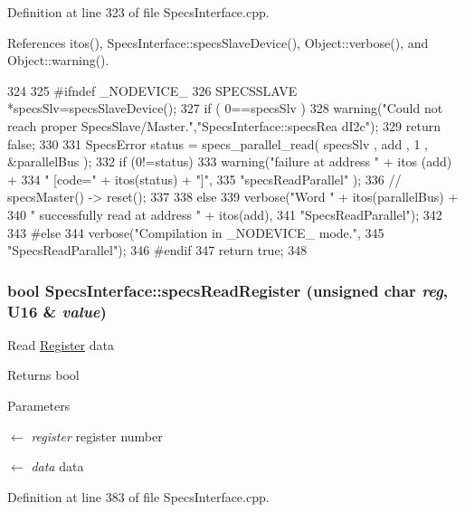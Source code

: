Definition at line 323 of file SpecsInterface.cpp.

References itos(), SpecsInterface::specsSlaveDevice(), Object::verbose(), and Object::warning().


\begin{DoxyCode}
324                                                       {
325 #ifndef _NODEVICE_
326   SPECSSLAVE *specsSlv=specsSlaveDevice();
327   if ( 0==specsSlv ){
328     warning("Could not reach proper SpecsSlave/Master.","SpecsInterface::specsRea
      dI2c");
329     return false;
330   }
331   SpecsError status = specs_parallel_read( specsSlv , add , 1 , &parallelBus );
332   if (0!=status){
333     warning("failure at address " + itos (add) +
334             " [code=" + itos(status) + "]",
335             "specsReadParallel" );
336     //    specsMaster() -> reset();
337   }
338   else {
339     verbose("Word " + itos(parallelBus) +
340             " successfully read at address " + itos(add),
341             "SpecsReadParallel");
342   }
343 #else
344   verbose("Compilation in _NODEVICE_ mode.",
345           "SpecsReadParallel");
346 #endif
347   return true;
348 }
\end{DoxyCode}
\hypertarget{classSpecsInterface_a87080bb575d1b9d0bb313c48e7d3f59a}{
\subsubsection[{specsReadRegister}]{\setlength{\rightskip}{0pt plus 5cm}bool SpecsInterface::specsReadRegister (unsigned char {\em reg}, \/  {\bf U16} \& {\em value})}}
\label{classSpecsInterface_a87080bb575d1b9d0bb313c48e7d3f59a}
Read \hyperlink{classRegister}{Register} data

\begin{DoxyReturn}{Returns}
bool 
\end{DoxyReturn}

\begin{DoxyParams}{Parameters}
\item[\mbox{$\leftarrow$} {\em register}]register number \item[\mbox{$\leftarrow$} {\em data}]data \end{DoxyParams}


Definition at line 383 of file SpecsInterface.cpp.

